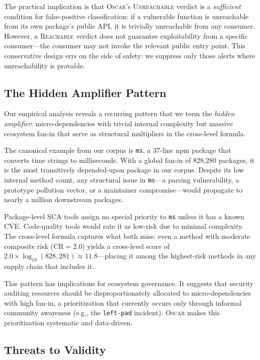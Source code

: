 \documentclass[conference]{IEEEtran}
\begin{document}
The practical implication is that \textsc{Oscar}'s \textsc{Unreachable} verdict is a \emph{sufficient} condition for false-positive classification: if a vulnerable function is unreachable from its own package's public API, it is trivially unreachable from any consumer. However, a \textsc{Reachable} verdict does not guarantee exploitability from a specific consumer—the consumer may not invoke the relevant public entry point. This conservative design errs on the side of safety: we suppress only those alerts where unreachability is provable.

\subsection{The Hidden Amplifier Pattern}
\label{subsec:hidden-amplifier}

Our empirical analysis reveals a recurring pattern that we term the \emph{hidden amplifier}: micro-dependencies with trivial internal complexity but massive ecosystem fan-in that serve as structural multipliers in the cross-level formula.

The canonical example from our corpus is \texttt{ms}, a 37-line npm package that converts time strings to milliseconds. With a global fan-in of 828,280 packages, it is the most transitively depended-upon package in our corpus. Despite its low internal method count, any structural issue in \texttt{ms}—a parsing vulnerability, a prototype pollution vector, or a maintainer compromise—would propagate to nearly a million downstream packages.

Package-level SCA tools assign no special priority to \texttt{ms} unless it has a known CVE. Code-quality tools would rate it as low-risk due to minimal complexity. The cross-level formula captures what both miss: even a method with moderate composite risk ($\mathrm{CR} = 2.0$) yields a cross-level score of $2.0 \times \log_{10}(828{,}281) \approx 11.8$---placing it among the highest-risk methods in any supply chain that includes it.

This pattern has implications for ecosystem governance. It suggests that security auditing resources should be disproportionately allocated to micro-dependencies with high fan-in, a prioritization that currently occurs only through informal community awareness (e.g., the \texttt{left-pad} incident). \textsc{Oscar} makes this prioritization systematic and data-driven.

\subsection{Threats to Validity}
\label{subsec:threats}
\end{document}
